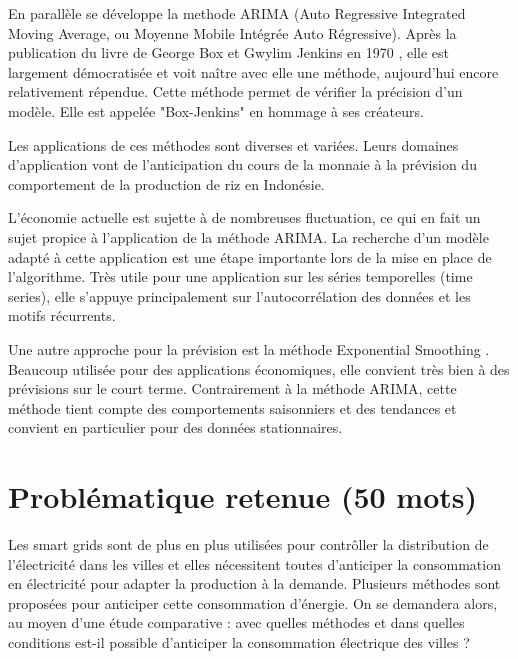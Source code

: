 \documentclass[12pt,a4paper]{article}
\begin{document}
En parallèle se développe la methode ARIMA (Auto Regressive Integrated Moving Average, ou Moyenne Mobile Intégrée Auto Régressive). Après la publication du livre de George Box et Gwylim Jenkins en 1970 \cite{boxjenkins}, elle est largement démocratisée et voit naître avec elle une méthode, aujourd'hui encore relativement répendue. Cette méthode permet de vérifier la précision d'un modèle. Elle est appelée "Box-Jenkins" en hommage à ses créateurs.

Les applications de ces méthodes sont diverses et variées. Leurs domaines d'application vont de l'anticipation du cours de la monnaie \cite{zambiaES} à la prévision du comportement de la production de riz en Indonésie.

L'économie actuelle est sujette à de nombreuses fluctuation, ce qui en fait un sujet propice à l'application de la méthode ARIMA. La recherche d'un modèle adapté \cite{hughchristensen} à cette application \cite{economyARIMA} est une étape importante lors de la mise en place de l'algorithme. Très utile pour une application sur les séries temporelles (time series), elle s'appuye principalement sur l'autocorrélation des données et les motifs récurrents.

Une autre approche pour la prévision est la méthode Exponential Smoothing \cite{exporeview}. Beaucoup utilisée pour des applications économiques, elle convient très bien à des prévisions sur le court terme. Contrairement à la méthode ARIMA, cette méthode tient compte des comportements saisonniers et des tendances et convient en particulier pour des données stationnaires.

\section*{Problématique retenue (50 mots)}
 Les smart grids sont de plus en plus utilisées pour contrôller la distribution de l'électricité dans les villes et elles nécessitent toutes d'anticiper la consommation en électricité pour adapter la production à la demande. Plusieurs méthodes sont proposées pour anticiper cette consommation d'énergie. On se demandera alors, au moyen d'une étude comparative : avec quelles méthodes et dans quelles conditions est-il possible d'anticiper la consommation électrique des villes ?
\end{document}
